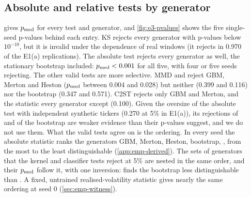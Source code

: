 \begin{table}[tbp]
  \centering
  \caption{Pre-specified power check of the verdict rule (E3). Anchored \WC{} test with the
    dependent protocol and the real E3 sizes, date ranks and split; rule: $\pmed\le0.05$ over
    five synthetic seeds; 100 replications per design. Alternative: synthetic volatility
    $\times1.2$. Boundary: generator with the law of the (pooled) past windows. Power with Wilson
    95\% intervals and one-sided 95\% Clopper--Pearson lower bound $\betaL$; boundary sizes with
    Clopper--Pearson 95\% intervals. $\widehat{\mathrm{se}}_{\mathrm{DK}}$: median
    Driscoll--Kraay standard error of $\Danc$ at the boundary.}
  \label{tab:e3-power}
  \small
\end{table}

\subsection{Absolute and relative tests by generator}\label{sec:emp-tests}

 gives $p_{\mathrm{med}}$ for every test and generator, and
\cref{fig:e3-pvalues} shows the five single-seed p-values behind each entry. KS rejects every
generator with p-values below $10^{-10}$, but it is invalid under the dependence of real windows
(it rejects in 0.970 of the E1(a) replications). The absolute \WC{} test rejects every generator
as well, the stationary bootstrap included: $p_{\mathrm{med}}<0.001$ for all five, with four or five seeds
rejecting. The other valid tests are more selective. MMD and \SigMMD{} reject GBM, Merton and
Heston ($p_{\mathrm{med}}$ between 0.004 and 0.028) but neither \GARCHt{} (0.399 and 0.116) nor the
bootstrap (0.347 and 0.571). C2ST rejects only GBM and Merton, and the \LRC{} statistic every
generator except \GARCHt{} (0.100). Given the oversize of the absolute \WC{} test with
independent synthetic tickers (0.270 at 5\% in E1(a)), its rejections of \GARCHt{} and of the
bootstrap are weaker evidence than their p-values suggest, and we do not use them. What the
valid tests agree on is the ordering. In every seed the absolute \WC{} statistic ranks the
generators GBM, Merton, Heston, bootstrap, \GARCHt{}, from the most to the least distinguishable
(\cref{app:emp-derived}). The sets of generators that the kernel and classifier tests reject at
5\% are nested in the same order, and their $p_{\mathrm{med}}$ follow it, with one inversion: \SigMMD{}
finds the bootstrap less distinguishable than \GARCHt{}. A fixed, untrained realised-volatility
statistic gives nearly the same ordering at seed 0 (\cref{sec:emp-witness}).

